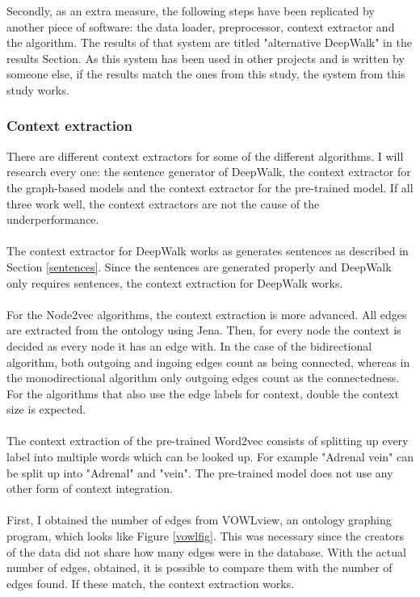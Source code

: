 \documentclass{article}
\begin{document}
  Secondly, as an extra measure, the following steps have been replicated by another piece of software: the data loader, preprocessor, context extractor and the algorithm. The results of that system are titled "alternative DeepWalk" in the results Section. As this system has been used in other projects and is written by someone else, if the results match the ones from this study, the system from this study works.
  
  \subsubsection{Context extraction} \label{contextextraction}
  There are different context extractors for some of the different algorithms. I will research every one: the sentence generator of DeepWalk, the context extractor for the graph-based models and the context extractor for the pre-trained model. If all three work well, the context extractors are not the cause of the underperformance.
  \paragraph{}
  The context extractor for DeepWalk works as generates sentences as described in Section \ref{sentences}. Since the sentences are generated properly and DeepWalk only requires sentences, the context extraction for DeepWalk works.
  \paragraph{}
  For the Node2vec algorithms, the context extraction is more advanced. All edges are extracted from the ontology using Jena. Then, for every node the context is decided as every node it has an edge with. In the case of the bidirectional algorithm, both outgoing and ingoing edges count as being connected, whereas in the monodirectional algorithm only outgoing edges count as the connectedness. For the algorithms that also use the edge labels for context, double the context size is expected.
  \paragraph{}
  The context extraction of the pre-trained Word2vec consists of splitting up every label into multiple words which can be looked up. For example "Adrenal vein" can be split up into "Adrenal" and "vein".
  The pre-trained model does not use any other form of context integration.
  \paragraph{}
  First, I obtained the number of edges from VOWLview\cite{vowlview}, an ontology graphing program, which looks like Figure \ref{vowlfig}. This was necessary since the creators of the data did not share how many edges were in the database. With the actual number of edges, obtained, it is possible to compare them with the number of edges found. If these match, the context extraction works.
  
\end{document}
